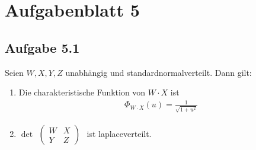 
\section{Aufgabenblatt 5}
\subsection{Aufgabe 5.1}
Seien $W,X,Y,Z$ unabhängig und standardnormalverteilt. Dann gilt:
\begin{enumerate}[label=\alph*)]
	\item Die charakteristische Funktion von $W\cdot X$ ist 
	\begin{align*}
		\Phi_{W\cdot X}(u)=\frac{1}{\sqrt{1+u^2}}
	\end{align*}
	\item $\det\begin{aligned}
		\begin{pmatrix}
			W & X\\
			Y & Z
		\end{pmatrix}
	\end{aligned}$ ist laplaceverteilt.
\end{enumerate}

